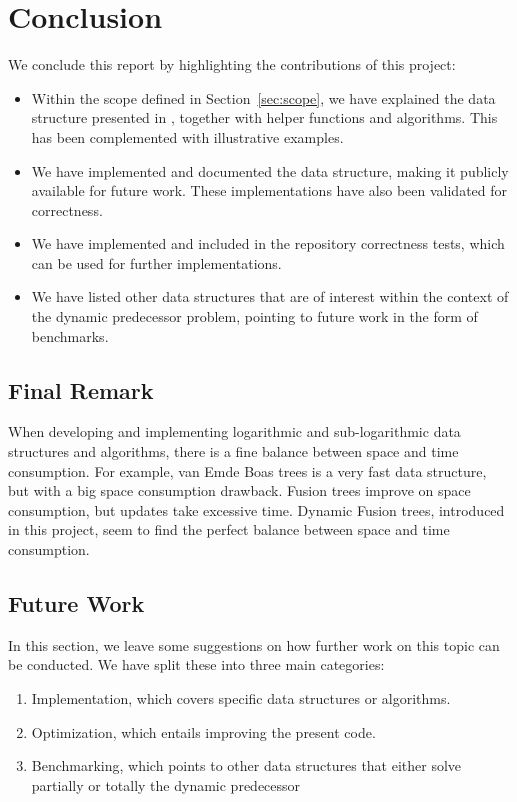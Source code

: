 \chapter{Conclusion} \label{sec:conclusionChapter}

We conclude this report by highlighting the contributions of this project:
\begin{itemize}
    \item
    Within the scope defined in Section~\ref{sec:scope}, we have explained the data structure presented in \cite{patrascu2014dynamic}, together with helper functions and algorithms. This has been complemented with illustrative examples.
    
    \item
    We have implemented and documented the data structure, making it publicly available for future work. These implementations have also been validated for correctness.
    
    \item
    We have implemented and included in the repository correctness tests, which can be used for further implementations.
    
    \item
    We have listed other data structures that are of interest within the context of the dynamic predecessor problem, pointing to future work in the form of benchmarks.
\end{itemize}

\section{Final Remark}

When developing and implementing logarithmic and sub-logarithmic data structures and algorithms, there is a fine balance between space and time consumption. For example, van Emde Boas trees is a very fast data structure, but with a big space consumption drawback. Fusion trees improve on space consumption, but updates take excessive time. Dynamic Fusion trees, introduced in this project, seem to find the perfect balance between space and time consumption.

\section{Future Work} \label{sec:futureWork}
In this section, we leave some suggestions on how further work on this topic can be conducted. We have split these into three main categories:
\begin{enumerate}
    \item
    Implementation, which covers specific data structures or algorithms.
    
    \item
    Optimization, which entails improving the present code.
    
    \item
    Benchmarking, which points to other data structures that either solve partially or totally the dynamic predecessor 
    
\end{enumerate}

